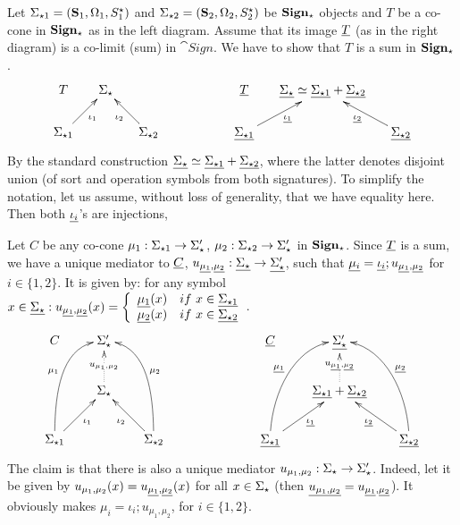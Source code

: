 \begin{PROOF}
Let $\Sigma_{\star 1}=({\bf S}_1,\Omega_1,S^\star_1)$ and 
$\Sigma_{\star 2}=({\bf S}_2,\Omega_2,S^\star_2)$ be ${\bf Sign_\star}$ objects and
$T$ be a co-cone 
in ${\bf Sign_\star}$ as in the left diagram. Assume that its image $\underline{T}$ (as in the right diagram) 
is a
co-limit (sum) in $\cat{Sign}$. We have to show that $T$ is a sum in
${\bf Sign_\star}$.
\[\xymatrix@R=0.6cm@C=0.5cm{
T  & \Sigma_\cons &   &&& \under T & \under{\Sigma_\cons}\iso
\under{\Sigma_{\cons 1}}+\under{\Sigma_{\cons 2}}\\
\Sigma_{\cons 1} \ar[ur]_{\iota_1} && \Sigma_{\cons 2} \ar[ul]^{\iota_2} 
  &&&
 \under{\Sigma_{\cons 1}} \ar[ur]_{\under{\iota_1}} &&
    \under{\Sigma_{\cons 2}} \ar[ul]^{\under{\iota_2}}
}
\]
By the standard construction $\underline{\Sigma_\star}\mathrel{\simeq} \underline{\Sigma_{\star
1}} + \underline{\Sigma_{\star 2}}$, where the latter denotes disjoint union (of
sort and operation symbols from both signatures). To simplify the notation,
let us assume, without loss of generality, that we have equality here. Then
both $\underline{\iota_i}$'s are injections,

Let $C$ be any co-cone $\mu_1:\Sigma_{\star 1}\to\Sigma'_\star$, $\mu_2:\Sigma_{\star
2}\to\Sigma'_\star$  in ${\bf Sign_\star}$. Since $\underline{T}$ is a sum, we have a unique mediator to $\underline{C}$, 
$u_{\underline{\mu_{1}},\underline{\mu_{2}}}:
\underline{\Sigma_\star}\to\underline{\Sigma'_\star}$, such that
$\underline{\mu_i}=\underline{\iota_i};u_{\underline{\mu_{1}},\underline{\mu_{2}}}$ for
$i\in\{1,2\}$.
It is given by: for any symbol
$x\in\underline{\Sigma_\star}:
u_{\underline{\mu_{1}},\underline{\mu_{2}}}(x)=\left\{\begin{array}{ll} 
 \underline{\mu_1}(x) & if\ x\in\underline{\Sigma_{\star 1}} \\
 \underline{\mu_2}(x) & if\ x\in\underline{\Sigma_{\star 2}}
\end{array}\right.$.
\[\xymatrix@R=0.8cm@C=0.7cm{
C & \Sigma'_\cons &  &&& \under C & \under{\Sigma'_\cons} \\
& \Sigma_\cons \ar@{.>}[u]|{u_{\mu_{1},\mu_{2}}}&  &&&  
  & \under{\Sigma_{\cons 1}}+\under{\Sigma_{\cons 2}} \ar@{.>}[u]|{u_{\under{\mu_{1}},\under{\mu_{2}}}}\\
\Sigma_{\cons 1} \ar[ur]_{\iota_1} \ar@(u,l)[uur]^{\mu_1} 
  && \Sigma_{\cons 2} \ar[ul]^{\iota_2}  \ar@(u,r)[uul]_{\mu_2} 
  &&&
 \under{\Sigma_{\cons 1}} \ar[ur]_{\under{\iota_1}} \ar@(u,l)[uur]^{\under{\mu_1}}
  &&  \under{\Sigma_{\cons 2}} \ar[ul]^{\under{\iota_2}}  \ar@(u,r)[uul]_{\under{\mu_2}}
}
\]
The claim is that there is also a unique mediator
$u_{\mu_{1},\mu_{2}}:\Sigma_\star\to\Sigma'_\star$. Indeed, let it be given
by $u_{\mu_{1},\mu_{2}}(x)= u_{\underline{\mu_{1}},\underline{\mu_{2}}}(x)$ for all
$x\in\Sigma_\star$ (then $\underline{u_{\mu_{1},\mu_{2}}}=
u_{\underline{\mu_{1}},\underline{\mu_{2}}}$). 
 It obviously
makes $\mu_i=\iota_i;u_{\mu_{1},\mu_{2}}$, for $i\in\{1,2\}$. 


\end{PROOF}

